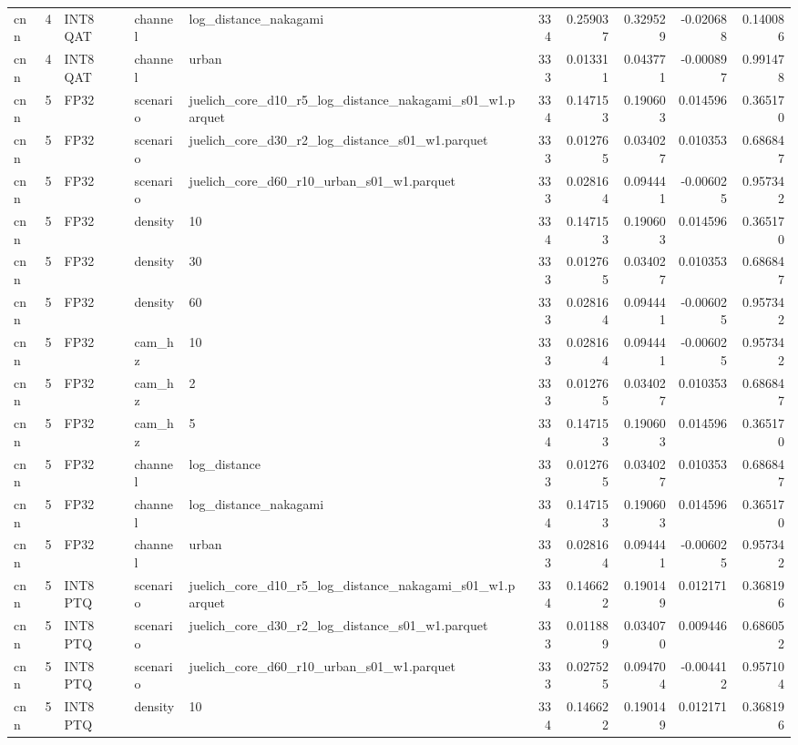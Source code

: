 \begin{tabular}{lrlllrrrrr}
cnn & 4 & INT8 QAT & channel & log\_distance\_nakagami & 334 & 0.259037 & 0.329529 & -0.020688 & 0.140086 \\
cnn & 4 & INT8 QAT & channel & urban & 333 & 0.013311 & 0.043771 & -0.000897 & 0.991478 \\
cnn & 5 & FP32 & scenario & juelich\_core\_d10\_r5\_log\_distance\_nakagami\_s01\_w1.parquet & 334 & 0.147153 & 0.190603 & 0.014596 & 0.365170 \\
cnn & 5 & FP32 & scenario & juelich\_core\_d30\_r2\_log\_distance\_s01\_w1.parquet & 333 & 0.012765 & 0.034027 & 0.010353 & 0.686847 \\
cnn & 5 & FP32 & scenario & juelich\_core\_d60\_r10\_urban\_s01\_w1.parquet & 333 & 0.028164 & 0.094441 & -0.006025 & 0.957342 \\
cnn & 5 & FP32 & density & 10 & 334 & 0.147153 & 0.190603 & 0.014596 & 0.365170 \\
cnn & 5 & FP32 & density & 30 & 333 & 0.012765 & 0.034027 & 0.010353 & 0.686847 \\
cnn & 5 & FP32 & density & 60 & 333 & 0.028164 & 0.094441 & -0.006025 & 0.957342 \\
cnn & 5 & FP32 & cam\_hz & 10 & 333 & 0.028164 & 0.094441 & -0.006025 & 0.957342 \\
cnn & 5 & FP32 & cam\_hz & 2 & 333 & 0.012765 & 0.034027 & 0.010353 & 0.686847 \\
cnn & 5 & FP32 & cam\_hz & 5 & 334 & 0.147153 & 0.190603 & 0.014596 & 0.365170 \\
cnn & 5 & FP32 & channel & log\_distance & 333 & 0.012765 & 0.034027 & 0.010353 & 0.686847 \\
cnn & 5 & FP32 & channel & log\_distance\_nakagami & 334 & 0.147153 & 0.190603 & 0.014596 & 0.365170 \\
cnn & 5 & FP32 & channel & urban & 333 & 0.028164 & 0.094441 & -0.006025 & 0.957342 \\
cnn & 5 & INT8 PTQ & scenario & juelich\_core\_d10\_r5\_log\_distance\_nakagami\_s01\_w1.parquet & 334 & 0.146622 & 0.190149 & 0.012171 & 0.368196 \\
cnn & 5 & INT8 PTQ & scenario & juelich\_core\_d30\_r2\_log\_distance\_s01\_w1.parquet & 333 & 0.011889 & 0.034070 & 0.009446 & 0.686052 \\
cnn & 5 & INT8 PTQ & scenario & juelich\_core\_d60\_r10\_urban\_s01\_w1.parquet & 333 & 0.027525 & 0.094704 & -0.004412 & 0.957104 \\
cnn & 5 & INT8 PTQ & density & 10 & 334 & 0.146622 & 0.190149 & 0.012171 & 0.368196 \\

\end{tabular}

